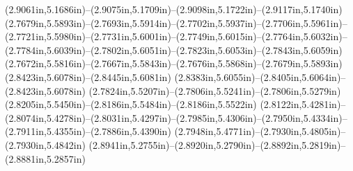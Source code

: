 (2.9061in,5.1686in)--(2.9075in,5.1709in)--(2.9098in,5.1722in)--(2.9117in,5.1740in) (2.7679in,5.5893in)--(2.7693in,5.5914in)--(2.7702in,5.5937in)--(2.7706in,5.5961in)--(2.7721in,5.5980in)--(2.7731in,5.6001in)--(2.7749in,5.6015in)--(2.7764in,5.6032in)--(2.7784in,5.6039in)--(2.7802in,5.6051in)--(2.7823in,5.6053in)--(2.7843in,5.6059in) (2.7672in,5.5816in)--(2.7667in,5.5843in)--(2.7676in,5.5868in)--(2.7679in,5.5893in) (2.8423in,5.6078in)--(2.8445in,5.6081in) (2.8383in,5.6055in)--(2.8405in,5.6064in)--(2.8423in,5.6078in) (2.7824in,5.5207in)--(2.7806in,5.5241in)--(2.7806in,5.5279in) (2.8205in,5.5450in)--(2.8186in,5.5484in)--(2.8186in,5.5522in) (2.8122in,5.4281in)--(2.8074in,5.4278in)--(2.8031in,5.4297in)--(2.7985in,5.4306in)--(2.7950in,5.4334in)--(2.7911in,5.4355in)--(2.7886in,5.4390in) (2.7948in,5.4771in)--(2.7930in,5.4805in)--(2.7930in,5.4842in) (2.8941in,5.2755in)--(2.8920in,5.2790in)--(2.8892in,5.2819in)--(2.8881in,5.2857in)
